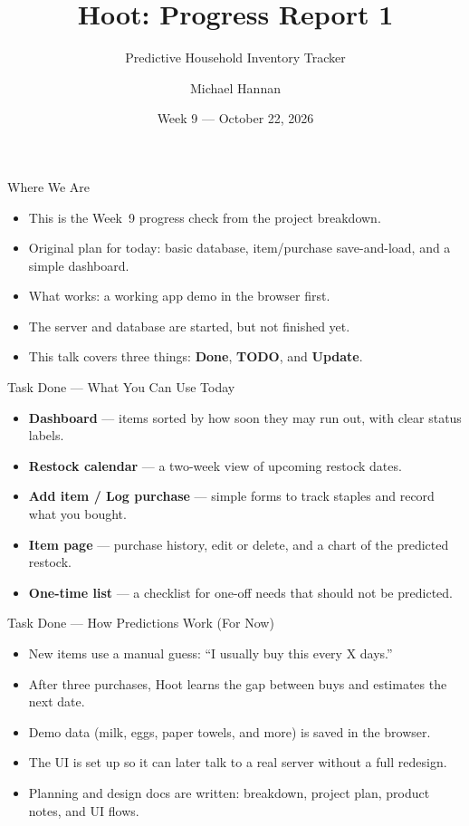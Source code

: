 \documentclass[aspectratio=169]{beamer}
\title[Hoot: Progress Report 1]{Hoot: Progress Report 1}
\subtitle{Predictive Household Inventory Tracker}
\author{Michael Hannan}
\date{Week 9 --- October 22, 2026}
\begin{document}
\begin{frame}
  \titlepage
\end{frame}

\begin{frame}{Where We Are}
  \begin{itemize}
    \item This is the Week~9 progress check from the project breakdown.
    \item Original plan for today: basic database, item/purchase save-and-load, and a simple dashboard.
    \item What works: a working app demo in the browser first.
    \item The server and database are started, but not finished yet.
    \item This talk covers three things: \textbf{Done}, \textbf{TODO}, and \textbf{Update}.
  \end{itemize}
\end{frame}

\begin{frame}{Task Done --- What You Can Use Today}
  \begin{itemize}
    \item \textbf{Dashboard} --- items sorted by how soon they may run out, with clear status labels.
    \item \textbf{Restock calendar} --- a two-week view of upcoming restock dates.
    \item \textbf{Add item / Log purchase} --- simple forms to track staples and record what you bought.
    \item \textbf{Item page} --- purchase history, edit or delete, and a chart of the predicted restock.
    \item \textbf{One-time list} --- a checklist for one-off needs that should not be predicted.
  \end{itemize}
\end{frame}

\begin{frame}{Task Done --- How Predictions Work (For Now)}
  \begin{itemize}
    \item New items use a manual guess: ``I usually buy this every X days.''
    \item After three purchases, Hoot learns the gap between buys and estimates the next date.
    \item Demo data (milk, eggs, paper towels, and more) is saved in the browser.
    \item The UI is set up so it can later talk to a real server without a full redesign.
    \item Planning and design docs are written: breakdown, project plan, product notes, and UI flows.
  \end{itemize}
\end{frame}
\end{document}
